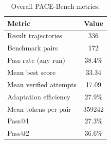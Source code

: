 \begin{table}[t]
    \centering
    \caption{Overall PACE-Bench metrics.}
    \label{tab:pace_overall_metrics}
    \begin{tabular}{lc}
        \toprule
        \textbf{Metric} & \textbf{Value} \\
        \midrule
        Result trajectories & 336 \\
        Benchmark pairs & 172 \\
        Pass rate (any run) & 38.4\% \\
        Mean best score & 33.34 \\
        Mean verified attempts & 17.09 \\
        Adaptation efficiency & 27.9\% \\
        Mean tokens per pair & 359242 \\
        Pass@1 & 27.3\% \\
        Pass@2 & 36.6\% \\
        \bottomrule
    \end{tabular}
\end{table}
